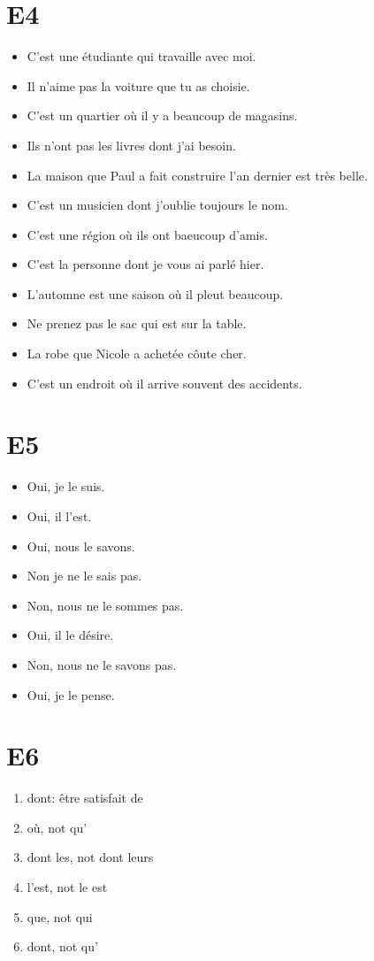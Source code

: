 \documentclass{book}
\begin{document}
    \section{E4}
        \begin{itemize}
            \item C'est une étudiante qui travaille avec moi.
            \item Il n'aime pas la voiture que tu as choisie.
            \item C'est un quartier où il y a beaucoup de magasins.
            \item Ils n'ont pas les livres dont j'ai besoin.
            \item La maison que Paul a fait construire l'an dernier est très belle.
            \item C'est un musicien dont j'oublie toujours le nom.
            \item C'est une région où ils ont baeucoup d'amis.
            \item C'est la personne dont je vous ai parlé hier.
            \item L'automne est une saison où il pleut beaucoup.
            \item Ne prenez pas le sac qui est sur la table.
            \item La robe que Nicole a achetée côute cher.
            \item C'est un endroit où il arrive souvent des accidents.
        \end{itemize}

    \section{E5}
        \begin{itemize}
            \item Oui, je le suis.
            \item Oui, il l'est.
            \item Oui, nous le savons.
            \item Non je ne le sais pas.
            \item Non, nous ne le sommes pas.
            \item Oui, il le désire.
            \item Non, nous ne le savons pas.
            \item Oui, je le pense.
        \end{itemize}

    \section{E6}
        \begin{enumerate}
            \item dont: être satisfait de
            \item où, not qu'
            \item dont les, not dont leurs
            \item l'est, not le est
            \item que, not qui
            \item dont, not qu'
        \end{enumerate}
\end{document}
